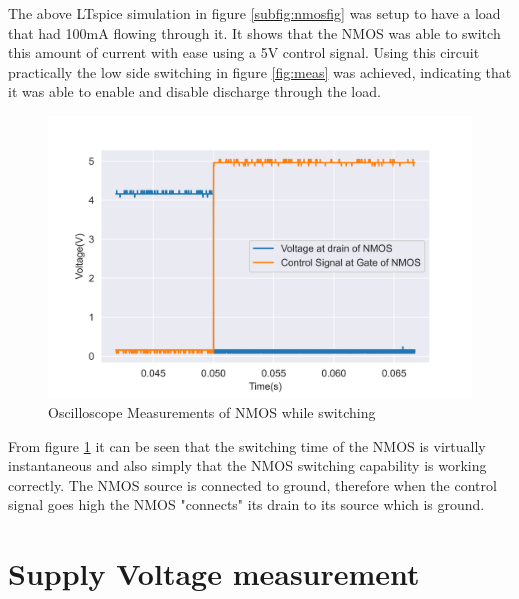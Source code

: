  The above LTspice simulation in figure \ref{subfig:nmosfig} was setup to have a load that had 100mA flowing through it. It shows that the NMOS was able to switch this amount of current with ease using a 5V control signal. Using this circuit practically the low side switching in figure \ref{fig:meas} was achieved, indicating that it was able to enable and disable discharge through the load.


\begin{figure}[!htb]
\centering
\includegraphics[scale=0.6]{./Figures/NMOSmeas}
\caption{Oscilloscope Measurements of NMOS while switching}
\label{fig:measNMOS}
\end{figure}

From figure \ref{fig:measNMOS} it can be seen that the switching time of the NMOS is virtually instantaneous and also simply that the NMOS switching capability is working correctly. The NMOS source is connected to ground, therefore when the control signal goes high the NMOS "connects" its drain to its source which is ground.

\newpage
\section{Supply Voltage measurement}


